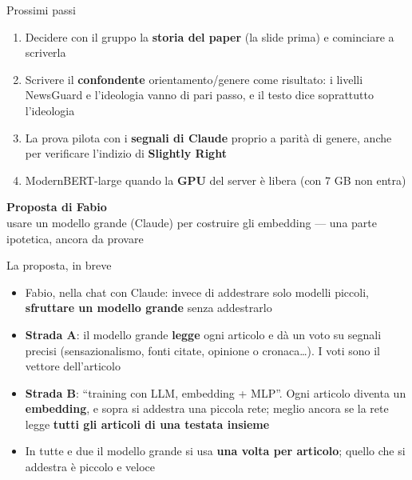 \documentclass[aspectratio=169]{beamer}
\newcommand{\hl}[1]{\textbf{#1}}
\newcommand{\divider}[2]{%
  \begin{frame}[plain]
    \vfill
    \begin{center}
      {\color{dividerblue}\Huge\textbf{#1}}\\[0.8em]
      {\large #2}
    \end{center}
    \vfill
  \end{frame}}
\begin{document}
\begin{frame}{Prossimi passi}
  \vfill
  \begin{enumerate}[<+->]
    \setlength\itemsep{0.8em}
    \item Decidere con il gruppo la \hl{storia del paper} (la slide prima) e cominciare a scriverla
    \item Scrivere il \hl{confondente} orientamento/genere come risultato: i livelli NewsGuard e l'ideologia vanno di pari passo, e il testo dice soprattutto l'ideologia
    \item La prova pilota con i \hl{segnali di Claude} proprio a parit\`a di genere, anche per verificare l'indizio di \hl{Slightly Right}
    \item ModernBERT-large quando la \hl{GPU} del server \`e libera (con 7 GB non entra)
  \end{enumerate}
  \vfill
\end{frame}

\divider{Proposta di Fabio}{usare un modello grande (Claude) per costruire gli embedding --- una parte ipotetica, ancora da provare}

\begin{frame}{La proposta, in breve}
  \vfill
  \begin{itemize}[<+->]
    \setlength\itemsep{0.8em}
    \item Fabio, nella chat con Claude: invece di addestrare solo modelli piccoli, \hl{sfruttare un modello grande} senza addestrarlo
    \item \hl{Strada A}: il modello grande \hl{legge} ogni articolo e d\`a un voto su segnali precisi (sensazionalismo, fonti citate, opinione o cronaca\dots). I voti sono il vettore dell'articolo
    \item \hl{Strada B}: ``training con LLM, embedding + MLP''. Ogni articolo diventa un \hl{embedding}, e sopra si addestra una piccola rete; meglio ancora se la rete legge \hl{tutti gli articoli di una testata insieme}
    \item In tutte e due il modello grande si usa \hl{una volta per articolo}; quello che si addestra \`e piccolo e veloce
  \end{itemize}
  \vfill
\end{frame}
\end{document}
